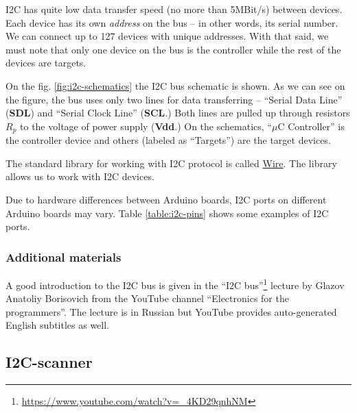 \documentclass[../sparc.tex]{subfiles}
\begin{document}
\gls{I2C} has quite low data transfer speed (no more than 5MBit/s) between
devices.  Each device has its own \textit{address} on the bus -- in other words,
its serial number.  We can connect up to 127 devices with unique addresses.
With that said, we must note that only one device on the bus is the controller
while the rest of the devices are targets.

On the fig. \ref{fig:i2c-schematics} the \gls{I2C} bus schematic is shown.  As
we can see on the figure, the bus uses only two lines for data transferring --
``Serial Data Line'' (\textbf{SDL}) and ``Serial Clock Line'' (\textbf{SCL}.)
Both lines are pulled up through resistors \textbf{$R_p$} to the voltage of
power supply (\textbf{Vdd}.)  On the schematics, ``$\mu$C Controller'' is the
controller device and others (labeled as ``Targets'') are the target devices.


The standard library for working with I2C protocol is called
\href{https://www.arduino.cc/reference/en/language/functions/communication/wire/}{Wire}.
The library allows us to work with I2C devices.


Due to hardware differences between Arduino boards, I2C ports on different
Arduino boards may vary.  Table \ref{table:i2c-pins} shows some examples of I2C
ports.

\subsubsection{Additional materials}

A good introduction to the I2C bus is given in the ``I2C
bus''\footnote{\url{https://www.youtube.com/watch?v=_4KD29qnhNM}} lecture by
Glazov Anatoliy Borisovich from the YouTube channel ``Electronics for the
programmers''.  The lecture is in Russian but YouTube provides auto-generated
English subtitles as well.


\subsection{I2C-scanner}
\label{section:i2c-scanner}
\end{document}
